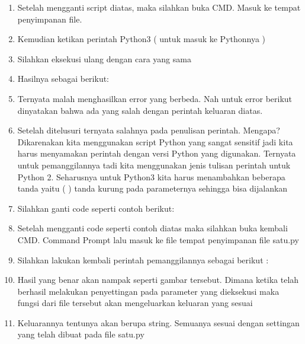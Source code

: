 \begin{enumerate}
\item Setelah mengganti script diatas, maka silahkan buka CMD. Masuk ke tempat penyimpanan file.
\item Kemudian ketikan perintah Python3 ( untuk masuk ke Pythonnya )
\item Silahkan eksekusi ulang dengan cara yang sama
\item Hasilnya sebagai berikut:
\item Ternyata malah menghasilkan error yang berbeda. Nah untuk error berikut dinyatakan bahwa ada yang salah dengan perintah keluaran diatas.
\item Setelah ditelusuri ternyata salahnya pada penulisan perintah. Mengapa? Dikarenakan kita menggunakan script Python yang sangat sensitif jadi kita harus menyamakan perintah dengan versi Python yang digunakan. Ternyata untuk pemanggilannya tadi kita menggunakan jenis tulisan perintah untuk Python 2. Seharusnya untuk Python3 kita harus menambahkan beberapa tanda yaitu ( ) tanda kurung pada parameternya sehingga bisa dijalankan
\item Silahkan ganti code seperti contoh berikut:
\item Setelah mengganti code seperti contoh diatas maka silahkan buka kembali CMD. Command Prompt lalu masuk ke file tempat penyimpanan file satu.py
\item Silahkan lakukan kembali perintah pemanggilannya sebagai berikut :
\item Hasil yang benar akan nampak seperti gambar tersebut. Dimana ketika telah berhasil melakukan penyettingan pada parameter yang dieksekusi maka fungsi dari file tersebut akan mengeluarkan keluaran yang sesuai
\item Keluarannya tentunya akan berupa string. Semuanya sesuai dengan settingan yang telah dibuat pada file satu.py
\end{enumerate}

